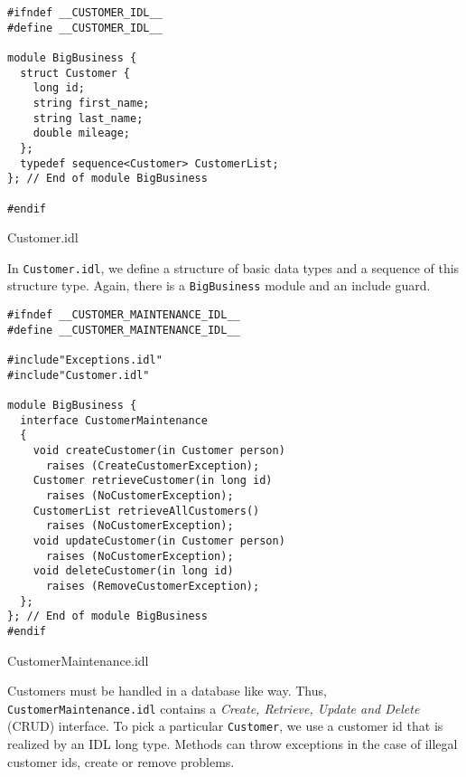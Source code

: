 \newpage
 
\begin{Example}
\begin{minifbox}
\begin{small}
\begin{verbatim}
#ifndef __CUSTOMER_IDL__
#define __CUSTOMER_IDL__

module BigBusiness {
  struct Customer {
    long id;
    string first_name;
    string last_name;
    double mileage;
  };
  typedef sequence<Customer> CustomerList;
}; // End of module BigBusiness

#endif
\end{verbatim}
\end{small}
\end{minifbox}
\caption{Customer.idl}
\label{example:Customer}
\end{Example}

In {\tt Customer.idl}, we define a structure of basic data types and a sequence 
of this structure type.
Again, there is a {\tt BigBusiness} module and an include guard.

\begin{Example}
\begin{minifbox}
\begin{small}
\begin{verbatim}
#ifndef __CUSTOMER_MAINTENANCE_IDL__
#define __CUSTOMER_MAINTENANCE_IDL__

#include"Exceptions.idl"
#include"Customer.idl"

module BigBusiness {
  interface CustomerMaintenance
  {
    void createCustomer(in Customer person) 
      raises (CreateCustomerException);
    Customer retrieveCustomer(in long id)  
      raises (NoCustomerException);
    CustomerList retrieveAllCustomers()  
      raises (NoCustomerException);
    void updateCustomer(in Customer person)  
      raises (NoCustomerException);
    void deleteCustomer(in long id)  
      raises (RemoveCustomerException);
  };
}; // End of module BigBusiness
#endif
\end{verbatim}
\end{small}
\end{minifbox}
\caption{CustomerMaintenance.idl}
\label{example:}
\end{Example}
Customers must be handled in a database like way. 
Thus, {\tt CustomerMaintenance.idl} contains a 
{\it Create, Retrieve, Update and Delete} (CRUD) interface. 
To pick a particular {\tt Customer}, we use a customer id that is realized by 
an IDL long type.
Methods can throw exceptions in the case of illegal customer ids, create or 
remove problems. 

